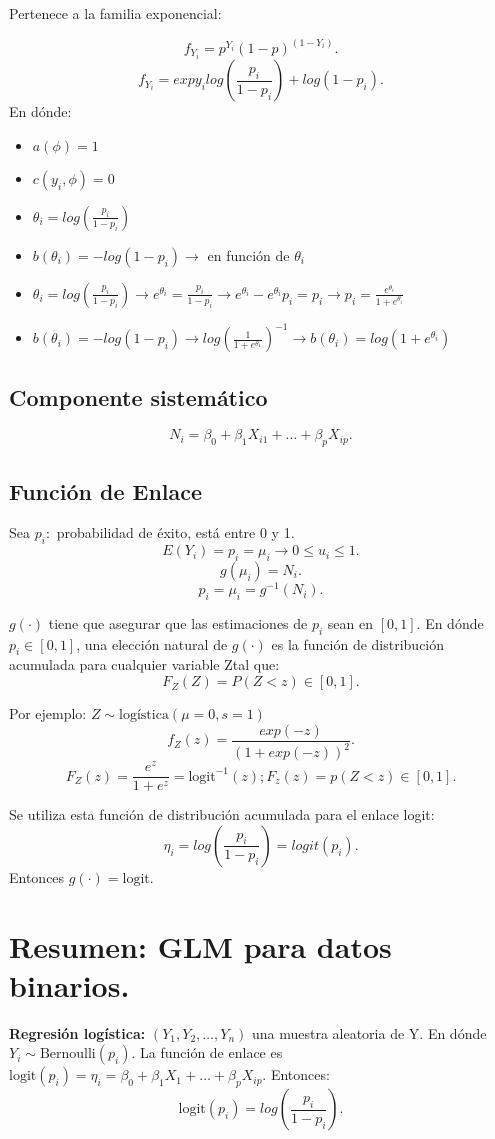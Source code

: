 \documentclass{article}
\begin{document}
Pertenece a la familia exponencial:

\[ f_{Y_{i}}=p^{Y_{i}}{(1-p)}^{{(1-Y_{i})}}.\]
\[f_{Y_{i}}=exp{y_{i}log{(\frac{p_{i}}{1-p_{i}})}+log{(1-p_{i})}}.\]
En dónde:
\begin{itemize}
	\item $a{(\phi)}=1$
	\item $c{(y_{i},\phi)}=0$
	\item $\theta_{i}=log{(\frac{p_{i}}{1-p_{i}})}$
	\item $b{(\theta_{i})}=-log{(1-p_{i})} \rightarrow$ en función de $\theta_{i}$
	\item $\theta_{i} = log{(\frac{p_{i}}{1-p_{i}})} \rightarrow e^{\theta_{i}}=\frac{p_{i}}{1-p_{i}} \rightarrow e^{\theta_{i}}-e^{\theta_{i}}p_{i}=p_{i} \rightarrow p_{i}=\frac{e^{\theta_{i}}}{1+e^{\theta_{i}}}$
	\item $b{(\theta_{i})}= -log{(1-p_{i})} \rightarrow log{(\frac{1}{1+e^{\theta_{1}}})}^{-1} \rightarrow b{(\theta_{i})}=log{(1+e^{\theta_{i}})}$ 
\end{itemize}

\subsection{Componente sistemático}
\[ N_{i}=\beta_{0}+\beta_{1}X_{i1}+\ldots+\beta_{p}X_{ip}.\]

\subsection{Función de Enlace}
Sea $p_{i}:$ probabilidad de éxito, está entre 0 y 1.
\[ E{(Y_{i})}=p_{i}=\mu_{i} \rightarrow 0 \leq u_{i} \leq 1.\]
\[ g{(\mu_{i})}=N_{i}.\]
\[ p_{i}=\mu_{i}=g^{-1}{(N_{i})}.\]

$g{(\cdot)}$ tiene que asegurar que las estimaciones de $p_{i}$ sean en $[0,1]$. En dónde $p_{i}\in [0,1]$, una elección natural de $g{(\cdot)}$ es la función de distribución acumulada para cualquier variable Ztal que:
\[ F_{Z}{(Z)}=P{(Z<z)}\in [0,1].\]

Por ejemplo: $Z \sim \text{logística}{(\mu=0,s=1)}$
\[ f_{Z}{(z)}=\frac{exp{(-z)}}{{(1+exp{(-z)})}^{2}}.\]
\[ F_{Z}{(z)}=\frac{e^{z}}{1+e^{z}}=\text{logit}^{-1}{(z)}; F_{z}{(z)}=p{(Z<z)}\in [0,1].\]

Se utiliza esta función de distribución acumulada para el enlace logit:
\[ \eta_{i}=log{(\frac{p_{i}}{1-p_{i}})}=logit{(p_{i})}.\]
Entonces $g{(\cdot)}=\text{logit}$.

\section{Resumen: GLM para datos binarios.}
\textbf{Regresión logística:}
$(Y_{1},Y_{2},\ldots,Y_{n})$ una muestra aleatoria de Y. En dónde $Y_{i} \sim \text{Bernoulli}{(p_{i})}$. La función de enlace es $\text{logit}{(p_{i})}=\eta_{i}=\beta_{0}+\beta_{1}X_{1}+\ldots+\beta_{p}X_{ip}$. Entonces:
\[ \text{logit}{(p_{i})}=log{(\frac{p_{i}}{1-p_{i}})}.\]
\end{document}
